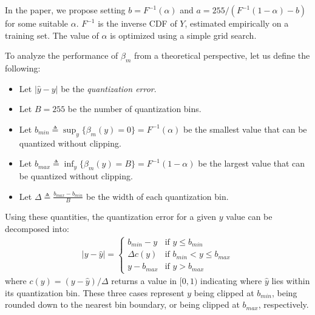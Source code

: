 \documentclass[]{article}
\begin{document}
In the paper, we propose setting $b = F^{-1}(\alpha)$ and $a = 255 / (F^{-1}(1 - \alpha) - b)$ for some suitable $\alpha$. $F^{-1}$ is the inverse CDF of $Y$, estimated empirically on a training set. The value of $\alpha$ is optimized using a simple grid search.

To analyze the performance of $\beta_m$ from a theoretical perspective, let us define the following:
\begin{itemize}
\itemsep1.5mm
\item{Let $|\hat{y} - y|$ be the \textit{quantization error}. }
\item{Let $B = 255$ be the number of quantization bins.}
\item{Let $b_{min} \triangleq \sup_y \{\beta_m(y) = 0\} = F^{-1}(\alpha)$ be the smallest value that can be quantized without clipping.}
\item{Let $b_{max} \triangleq \inf_y \{\beta_m(y) = B\} = F^{-1}(1 - \alpha)$ be the largest value that can be quantized without clipping.}
\item{Let $\Delta \triangleq \frac{b_{max} - b_{min} }{ B }$ be the width of each quantization bin.}
\end{itemize}

Using these quantities, the quantization error for a given $y$ value can be decomposed into:
\begin{align} \label{eq:decomposition}
    |y - \hat{y}| =
    \begin{cases}
        b_{min} - y         & \text{if } y \le b_{min} \\
        \Delta c(y)         & \text{if } b_{min} < y \le b_{max} \\
        y - b_{max}         & \text{if } y > b_{max}
    \end{cases}
\end{align}
where $c(y) = (y - \hat{y}) / \Delta$ returns a value in $[0, 1)$ indicating where $\hat{y}$ lies within its quantization bin. These three cases represent $y$ being clipped at $b_{min}$, being rounded down to the nearest bin boundary, or being clipped at $b_{max}$, respectively.
\end{document}
